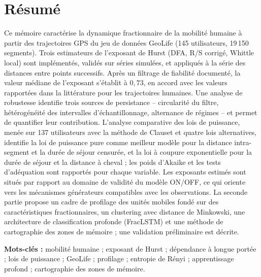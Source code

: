 \chapter*{Résumé}
Ce mémoire caractérise la dynamique fractionnaire de la mobilité humaine à partir des trajectoires GPS du jeu de données GeoLife (145 utilisateurs, 19\,150 segments). Trois estimateurs de l'exposant de Hurst (DFA, R/S corrigé, Whittle local) sont implémentés, validés sur séries simulées, et appliqués à la série des distances entre points successifs. Après un filtrage de fiabilité documenté, la valeur médiane de l'exposant s'établit à $0{,}73$, en accord avec les valeurs rapportées dans la littérature pour les trajectoires humaines. Une analyse de robustesse identifie trois sources de persistance -- circularité du filtre, hétérogénéité des intervalles d'échantillonnage, alternance de régimes -- et permet de quantifier leur contribution. L'analyse comparative des lois de puissance, menée sur 137 utilisateurs avec la méthode de Clauset et quatre lois alternatives, identifie la loi de puissance pure comme meilleur modèle pour la distance intra-segment et la durée de séjour censurée, et la loi à coupure exponentielle pour la durée de séjour et la distance à cheval ; les poids d'Akaike et les tests d'adéquation sont rapportés pour chaque variable. Les exposants estimés sont situés par rapport au domaine de validité du modèle ON/OFF, ce qui oriente vers les mécanismes générateurs compatibles avec les observations. La seconde partie propose un cadre de profilage des unités mobiles fondé sur des caractéristiques fractionnaires, un clustering avec distance de Minkowski, une architecture de classification profonde (FracLSTM) et une méthode de cartographie des zones de mémoire ; une validation préliminaire est décrite.

\textbf{Mots-clés :} mobilité humaine ; exposant de Hurst ; dépendance à longue portée ; lois de puissance ; GeoLife ; profilage ; entropie de Rényi ; apprentissage profond ; cartographie des zones de mémoire.

